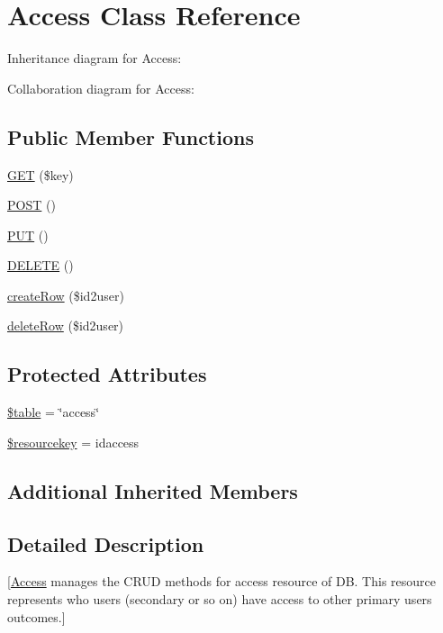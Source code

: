 \hypertarget{class_access}{}\section{Access Class Reference}
\label{class_access}


Inheritance diagram for Access\+:


Collaboration diagram for Access\+:
\subsection*{Public Member Functions}
\begin{DoxyCompactItemize}
\item 
\mbox{\hyperlink{class_access_a7490aac9922424f1e605adf9cda9a78b}{G\+ET}} (\$key)
\item 
\mbox{\hyperlink{class_access_a2a7e865a6254f6af7005197d30ad1cc0}{P\+O\+ST}} ()
\item 
\mbox{\hyperlink{class_access_a2a21af1d6aaaa31249485c753b86eba1}{P\+UT}} ()
\item 
\mbox{\hyperlink{class_access_ab31369bc9c8f31518ed38c1949beb791}{D\+E\+L\+E\+TE}} ()
\item 
\mbox{\hyperlink{class_access_aa70acba6d8f9c9393f138139449e2cff}{create\+Row}} (\$id2user)
\item 
\mbox{\hyperlink{class_access_a51906b13f88008ec2d5de18598b01216}{delete\+Row}} (\$id2user)
\end{DoxyCompactItemize}
\subsection*{Protected Attributes}
\begin{DoxyCompactItemize}
\item 
\mbox{\hyperlink{class_access_ae8876a14058f368335baccf35af4a22b}{\$table}} = \char`\"{}access\char`\"{}
\item 
\mbox{\hyperlink{class_access_aebf9a45aba50bace51a0400cdafdd8d3}{\$resourcekey}} = \textquotesingle{}idaccess\textquotesingle{}
\end{DoxyCompactItemize}
\subsection*{Additional Inherited Members}


\subsection{Detailed Description}
\mbox{[}\mbox{\hyperlink{class_access}{Access}} manages the C\+R\+UD methods for access resource of DB. This resource represents who users (secondary or so on) have access to other primary users outcomes.\mbox{]} 

